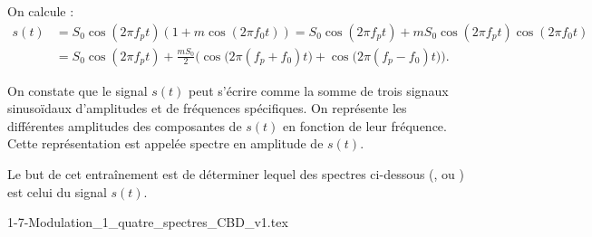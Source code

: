 \begin{corrige}
On calcule :
\begin{align*}
	s(t) 
	&= S_0 \cos \left(2\pi f_p t\right) \left(1+m \cos \left(2\pi f_0 t\right) \right) = S_0 \cos \left(2\pi f_p t\right) + m S_0 \cos \left(2\pi f_p t\right)\cos \left(2\pi f_0 t\right)\\
&= S_0 \cos \left(2\pi f_p t \right) + \frac{mS_0}{2} \Big( \cos \big( 2\pi\left( f_p + f_0 \right) t \big)
	+ \cos \big( 2\pi\left(f_p - f_0 \right) t \big) \Big).
	\end{align*}
\end{corrige}

	
	
\pauseEntrainement

\bigskip


On constate que le signal $s(t)$ peut s'écrire comme la somme de trois signaux sinusoïdaux d'amplitudes et de fréquences spécifiques. On représente les différentes amplitudes des composantes de $s(t)$ en fonction de leur fréquence. Cette représentation est appelée spectre en amplitude de $s(t)$.

Le but de cet entraînement est de déterminer lequel des spectres ci-dessous (\reponseA{}, \reponseB{} ou \reponseC{}) est celui du signal $s(t)$.







\begin{center}
	\def\scaleImage{0.55}
	{1-7-Modulation_1_quatre_spectres_CBD_v1.tex}
\end{center} 

\repriseEntrainement


